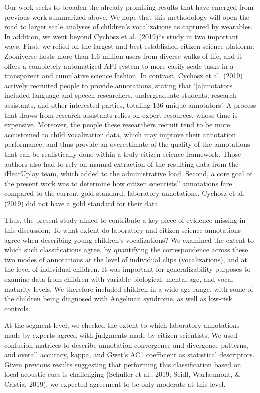 \documentclass[english,,man]{apa6}
\begin{document}
Our work seeks to broaden the already promising results that have emerged from previous work summarized above. We hope that this methodology will open the road to larger scale analyses of children's vocalizations as captured by wearables. In addition, we went beyond Cychosz et al. (2019)\enquote{s study in two important ways. First, we relied on the largest and best established citizen science platform: Zooniverse hosts more than 1.6 million users from diverse walks of life, and it offers a completely automatized API system to more easily scale tasks in a transparent and cumulative science fashion. In contrast, Cychosz et al. (2019) actively recruited people to provide annotations, stating that \enquote{{[}a{]}nnotators included language and speech researchers, undergraduate students, research assistants, and other interested parties, totaling 136 unique annotators}. A process that draws from research assistants relies on expert resources, whose time is expensive. Moreover, the people these researchers recruit tend to be more accustomed to child vocalization data, which may improve their annotation performance, and thus provide an overestimate of the quality of the annotations that can be realistically done within a truly citizen science framework. Those authors also had to rely on manual extraction of the resulting data from the iHearUplay team, which added to the administrative load. Second, a core goal of the present work was to determine how citizen scientists} annotations fare compared to the current gold standard, laboratory annotations. Cychosz et al. (2019) did not have a gold standard for their data.

Thus, the present study aimed to contribute a key piece of evidence missing in this discussion: To what extent do laboratory and citizen science annotations agree when describing young children's vocalizations? We examined the extent to which such classifications agree, by quantifying the correspondence across these two modes of annotations at the level of individual clips (vocalizations), and at the level of individual children. It was important for generalizability purposes to examine data from children with variable biological, mental age, and vocal maturity levels. We therefore included children in a wide age range, with some of the children being diagnosed with Angelman syndrome, as well as low-risk controls.

At the segment level, we checked the extent to which laboratory annotations made by experts agreed with judgments made by citizen scientists. We used confusion matrices to describe annotation convergence and divergence patterns, and overall accuracy, kappa, and Gwet's AC1 coefficient as statistical descriptors. Given previous results suggesting that performing this classification based on local acoustic cues is challenging (Schuller et al., 2019; Seidl, Warlaumont, \& Cristia, 2019), we expected agreement to be only moderate at this level.
\end{document}

